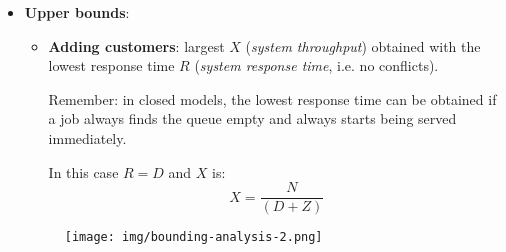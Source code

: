 \begin{itemize}
\begin{itemize}
		\newpage


		\item \textbf{Upper bounds}:
		\begin{itemize}
			\item \textbf{Adding customers}: largest $X$ (\emph{system throughput}) obtained with the lowest response time $R$ (\emph{system response time}, i.e. no conflicts).
			
			Remember: in closed models, the lowest response time can be obtained if a job always finds the queue empty and always starts being served immediately.

			In this case $R = D$ and $X$ is:
			\begin{equation}\label{eq: upper bound for light load}
				X = \dfrac{N}{\left(D + Z\right)}
			\end{equation}
		\end{itemize}
		\begin{figure}[!htp]
			\centering
			\texttt{[image: img/bounding-analysis-2.png]}
		\end{figure}
	\end{itemize}



\end{itemize}
